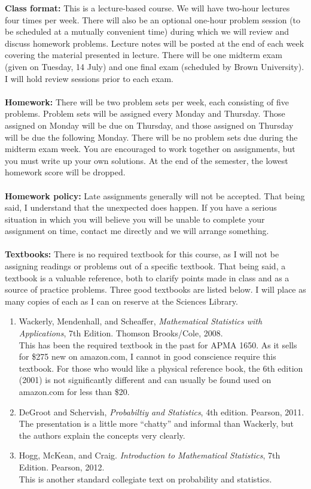 \documentclass[11pt]{article}
\begin{document}
\textbf {Class format:} This is a lecture-based course. We will have two-hour lectures four times per week. There will also be an optional one-hour problem session (to be scheduled at a mutually convenient time) during which we will review and discuss homework problems. Lecture notes will be posted at the end of each week covering the material presented in lecture. There will be one midterm exam (given on Tuesday, 14 July) and one final exam (scheduled by Brown University). I will hold review sessions prior to each exam.
\\\\
\textbf {Homework: }There will be two problem sets per week, each consisting of five problems. Problem sets will be assigned every Monday and Thursday. Those assigned on Monday will be due on Thursday, and those assigned on Thursday will be due the following Monday. There will be no problem sets due during the midterm exam week. You are encouraged to work together on assignments, but you must write up your own solutions. At the end of the semester, the lowest homework score will be dropped. \\\\
\textbf{Homework policy: }Late assignments generally will not be accepted. That being said, I understand that the unexpected does happen. If you have a serious situation in which you will believe you will be unable to complete your assignment on time, contact me directly and we will arrange something.\\\\
\textbf {\large Textbooks:} There is no required textbook for this course, as I will not be assigning readings or problems out of a specific textbook. That being said, a textbook is a valuable reference, both to clarify points made in class and as a source of practice problems. Three good textbooks are listed below. I will place as many copies of each as I can on reserve at the Sciences Library.
\begin{enumerate}
\item Wackerly, Mendenhall, and Scheaffer, \emph{Mathematical Statistics with Applications}, 7th Edition. Thomson Brooks/Cole, 2008. \\
This has been the required textbook in the past for APMA 1650. As it sells for \$275 new on amazon.com, I cannot in good conscience require this textbook. For those who would like a physical reference book, the 6th edition (2001) is not significantly different and can usually be found used on amazon.com for less than \$20.
\item DeGroot and Schervish, \emph{Probabiltiy and Statistics}, 4th edition. Pearson, 2011.\\
The presentation is a little more ``chatty'' and informal than Wackerly, but the authors explain the concepts very clearly.
\item Hogg, McKean, and Craig. \emph{Introduction to Mathematical Statistics}, 7th Edition. Pearson, 2012. \\
This is another standard collegiate text on probability and statistics.
\end{enumerate}
\end{document}
